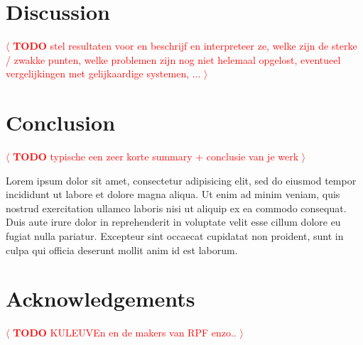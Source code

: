 \documentclass[review]{acmsiggraph}
\newcommand{\todo}[1]{\textcolor{red}{\(\langle\) \textbf{TODO} #1 \(\rangle\) }}
\begin{document}
\section{Discussion}
\todo{stel resultaten voor
en beschrijf en interpreteer ze, welke zijn de sterke / zwakke punten,
welke problemen zijn nog niet helemaal opgelost, eventueel
vergelijkingen met gelijkaardige systemen, ...}

\section{Conclusion}
\todo{typische een zeer korte summary + conclusie van je werk}

Lorem ipsum dolor sit amet, consectetur adipisicing elit, sed do
eiusmod tempor incididunt ut labore et dolore magna aliqua. Ut enim ad
minim veniam, quis nostrud exercitation ullamco laboris nisi ut
aliquip ex ea commodo consequat. Duis aute irure dolor in
reprehenderit in voluptate velit esse cillum dolore eu fugiat nulla
pariatur. Excepteur sint occaecat cupidatat non proident, sunt in
culpa qui officia deserunt mollit anim id est laborum.

\section*{Acknowledgements}
\todo{KULEUVEn en de makers van RPF enzo..}





\end{document}
